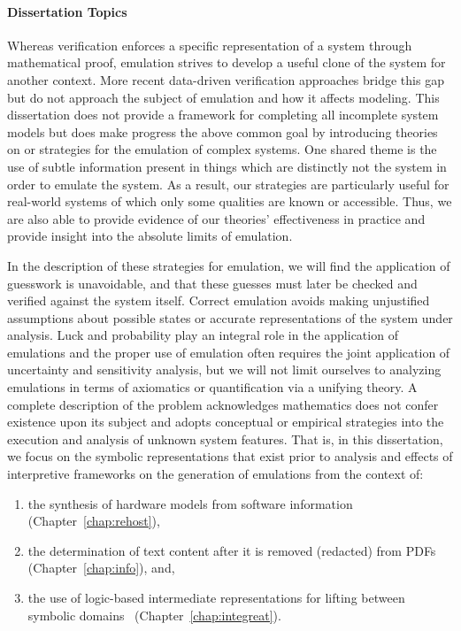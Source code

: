 \paragraph{Dissertation Topics}
Whereas verification enforces a specific representation of a system through mathematical proof, emulation strives to develop a useful clone of the system for another context.
More recent data-driven verification approaches bridge this gap but do not approach the subject of emulation and how it affects modeling.
This dissertation does not provide a framework for completing all incomplete system models but does make progress the above common goal by introducing theories on or strategies for the emulation of complex systems.
One shared theme is the use of subtle information present in things which are distinctly not the system in order to emulate the system.
As a result, our strategies are particularly useful for real-world systems of which only some qualities are known or accessible.
Thus, we are also able to provide evidence of our theories' effectiveness in practice and provide insight into the absolute limits of emulation.

In the description of these strategies for emulation, we will find the application of guesswork is unavoidable, and that these guesses must later be checked and verified against the system itself.
Correct emulation avoids making unjustified assumptions about possible states or accurate representations of the system under analysis.
Luck and probability play an integral role in the application of emulations and the proper use of emulation often requires the joint application of uncertainty and sensitivity analysis, but we will not limit ourselves to analyzing emulations in terms of axiomatics or quantification via a unifying theory.
A complete description of the problem acknowledges mathematics does not confer existence upon its subject and adopts conceptual or empirical strategies into the execution and analysis of unknown system features.
That is, in this dissertation, we focus on the symbolic representations that exist prior to analysis and effects of interpretive frameworks on the generation of emulations from the context of:

\begin{enumerate}
	\item the synthesis of hardware models from software information~\cite{johnson2021jetset} (Chapter~\ref{chap:rehost}),
	\item the determination of text content after it is removed (redacted) from PDFs~\cite{bland2023story} (Chapter~\ref{chap:info}), and,
	\item the use of logic-based intermediate representations for lifting between symbolic domains~\cite{bland2023integreat} (Chapter~\ref{chap:integreat}).
\end{enumerate}

